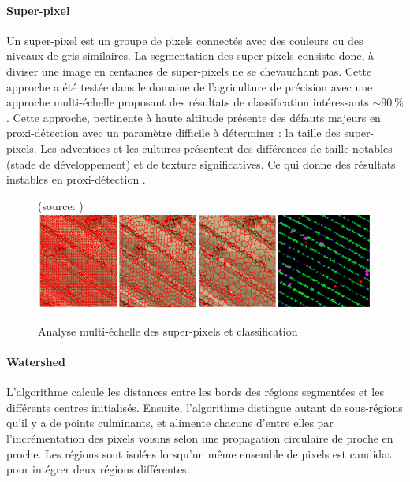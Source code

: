 \documentclass[../thesis.tex]{subfiles}
\begin{document}
    \paragraph{Super-pixel} Un super-pixel est un groupe de pixels connectés avec des couleurs ou des niveaux de gris similaires. La segmentation des super-pixels consiste donc, à diviser une image en centaines de super-pixels ne se chevauchant pas. Cette approche a été testée dans le domaine de l'agriculture de précision avec une approche multi-échelle \cite{DBLP:journals/corr/abs-1805-12395} proposant des résultats de classification intéressants $\sim \SI{90}{\percent}$. Cette approche, pertinente à haute altitude présente des défauts majeurs en proxi-détection avec un paramètre difficile à déterminer : la taille des super-pixels. Les adventices et les cultures présentent des différences de taille notables (stade de développement) et de texture significatives. Ce qui donne des résultats instables en proxi-détection \cite{li2021identification}.
    
    \begin{figure}[H]
        \centering
        {\scriptsize (source: \cite{DBLP:journals/corr/abs-1805-12395})} \\
        \includegraphics[width=0.7\linewidth]{img/biblio/segmentation-superpixel}
        \caption{Analyse multi-échelle des super-pixels et classification}
        \label{fig:03-superpixel}
    \end{figure}
    
    
    \paragraph{Watershed} L'algorithme calcule les distances entre les bords des régions segmentées et les différents centres initialisés. Ensuite, l'algorithme distingue autant de sous-régions qu'il y a de points culminants, et alimente chacune d'entre elles par l'incrémentation des pixels voisins selon une propagation circulaire de proche en proche. Les régions sont isolées lorsqu'un même ensemble de pixels est candidat pour intégrer deux régions différentes.
    
\end{document}

